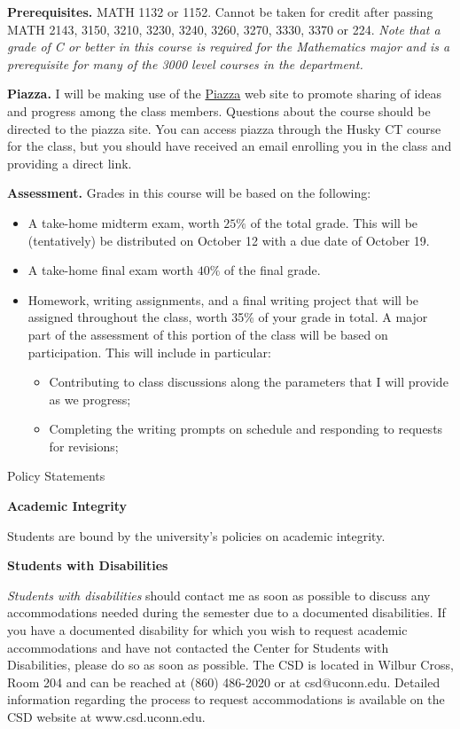 \documentclass[12pt]{article}
\begin{document}
{\bf Prerequisites.} MATH 1132 or 1152. Cannot be taken for credit after passing MATH 2143, 3150, 3210, 3230, 3240, 3260, 3270, 3330, 3370 or 224. {\it Note that a grade of C or better in this course is required for the Mathematics major and is a prerequisite for many of the 3000 level courses in the department.}


{\bf Piazza.} I will be making use of the \href{https://piazza.com/class/kcp1cyt4u5r440}{Piazza}
web site to promote sharing of ideas and progress among the class members.
Questions about the course should be directed to the piazza site.  You can access piazza
through the Husky CT course for the class, but you should have received an email enrolling
you in the class and providing a direct link.

{\bf Assessment.}  Grades in this course will be based on the
following:
\begin{itemize}
\item A take-home midterm exam,  worth $25\%$ of the total grade.  This will be (tentatively)
  be distributed on October 12 with a due date of October 19.
\item A take-home final exam worth $40\%$ of the final grade.
\item Homework, writing assignments, and a final writing project that will be assigned throughout
  the class, worth 35\% of your grade in total.  A major part of the assessment of this portion of the class will be based on participation.
  This will include in particular:
  \begin{itemize}
  \item Contributing to class discussions along the parameters that I will provide as we progress;
  \item Completing the writing prompts on schedule and responding to requests for revisions;
\end{itemize}

\end{itemize}

\begin{center}

{\Large Policy Statements}

\end{center}


{\bf Academic Integrity} 

Students are bound by the university's policies on academic integrity.

{\bf Students with Disabilities}

{\it Students with disabilities} should contact me as soon as
possible to discuss any accommodations needed during the semester due
to a documented disabilities.  If you have a documented disability for
which you wish to request academic accommodations and have not
contacted the Center for Students with Disabilities, please do so as
soon as possible.  The CSD is located in Wilbur Cross, Room 204 and
can be reached at (860) 486-2020 or at csd@uconn.edu.  Detailed
information regarding the process to request accommodations is
available on the CSD website at www.csd.uconn.edu.  
\end{document}
